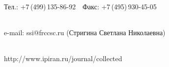 {{\begin{center}
Тел.: +7\,(499)\,135-86-92\ \ Факс:  +7\,(495)\,930-45-05\\[-8pt]





 \





e-mail:   {\sf ssi@frccsc.ru} (Стригина Светлана Николаевна)\\[-8pt]





\





{\sf http://www.ipiran.ru/journal/collected}


\end{center}


}}





\def\rightkol{Правила подготовки рукописей статей}


\def\leftkol{Правила подготовки рукописей статей}


